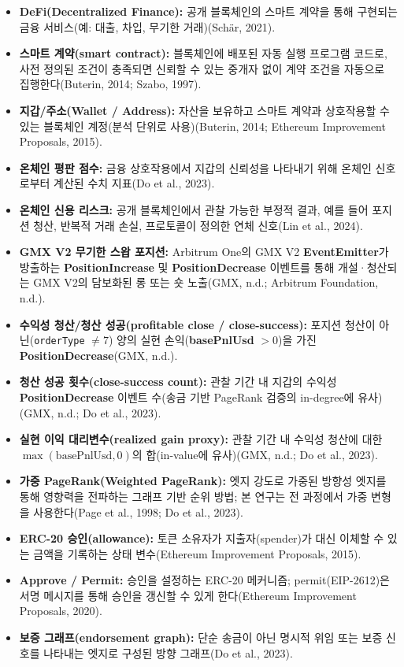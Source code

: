 \begin{itemize}
\item[\textbullet] \textbf{DeFi(Decentralized Finance): }공개 블록체인의 스마트 계약을 통해 구현되는 금융 서비스(예: 대출, 차입, 무기한 거래)(Sch\"{a}r, 2021).
\item[\textbullet] \textbf{스마트 계약(smart contract): }블록체인에 배포된 자동 실행 프로그램 코드로, 사전 정의된 조건이 충족되면 신뢰할 수 있는 중개자 없이 계약 조건을 자동으로 집행한다(Buterin, 2014; Szabo, 1997).
\item[\textbullet] \textbf{지갑/주소(Wallet / Address): }자산을 보유하고 스마트 계약과 상호작용할 수 있는 블록체인 계정(분석 단위로 사용)(Buterin, 2014; Ethereum Improvement Proposals, 2015).
\item[\textbullet] \textbf{온체인 평판 점수: }금융 상호작용에서 지갑의 신뢰성을 나타내기 위해 온체인 신호로부터 계산된 수치 지표(Do et al., 2023).
\item[\textbullet] \textbf{온체인 신용 리스크: }공개 블록체인에서 관찰 가능한 부정적 결과, 예를 들어 포지션 청산, 반복적 거래 손실, 프로토콜이 정의한 연체 신호(Lin et al., 2024).
\item[\textbullet] \textbf{GMX V2 무기한 스왑 포지션: }Arbitrum One의 GMX V2 \textbf{EventEmitter}가 방출하는 \textbf{PositionIncrease} 및 \textbf{PositionDecrease} 이벤트를 통해 개설·청산되는 GMX V2의 담보화된 롱 또는 숏 노출(GMX, n.d.; Arbitrum Foundation, n.d.).
\item[\textbullet] \textbf{수익성 청산/청산 성공(profitable close / close-success): }포지션 청산이 아닌(\texttt{orderType} $\neq 7$) 양의 실현 손익(\textbf{basePnlUsd} $> 0$)을 가진 \textbf{PositionDecrease}(GMX, n.d.).
\item[\textbullet] \textbf{청산 성공 횟수(close-success count): }관찰 기간 내 지갑의 수익성 \textbf{PositionDecrease} 이벤트 수(송금 기반 PageRank 검증의 in-degree에 유사)(GMX, n.d.; Do et al., 2023).
\item[\textbullet] \textbf{실현 이익 대리변수(realized gain proxy): }관찰 기간 내 수익성 청산에 대한 $\max(\text{basePnlUsd}, 0)$의 합(in-value에 유사)(GMX, n.d.; Do et al., 2023).
\item[\textbullet] \textbf{가중 PageRank(Weighted PageRank): }엣지 강도로 가중된 방향성 엣지를 통해 영향력을 전파하는 그래프 기반 순위 방법; 본 연구는 전 과정에서 가중 변형을 사용한다(Page et al., 1998; Do et al., 2023).
\item[\textbullet] \textbf{ERC-20 승인(allowance): }토큰 소유자가 지출자(spender)가 대신 이체할 수 있는 금액을 기록하는 상태 변수(Ethereum Improvement Proposals, 2015).
\item[\textbullet] \textbf{Approve / Permit: }승인을 설정하는 ERC-20 메커니즘; permit(EIP-2612)은 서명 메시지를 통해 승인을 갱신할 수 있게 한다(Ethereum Improvement Proposals, 2020).
\item[\textbullet] \textbf{보증 그래프(endorsement graph): }단순 송금이 아닌 명시적 위임 또는 보증 신호를 나타내는 엣지로 구성된 방향 그래프(Do et al., 2023).
\end{itemize}
